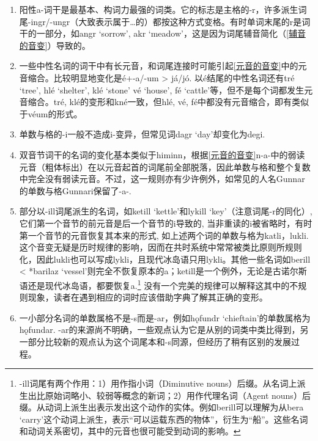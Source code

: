 \begin{enumerate}
  \def\labelenumi{\arabic{enumi})}
  \item
        阳性a-词干是最基本、构词力最强的词类。它的标志是主格的-r，许多派生词尾-ingr/-ungr（大致表示属于\ldots 的）都按这种方式变格。有时单词末尾的r是词干的一部分，如angr
        `sorrow', akr
        `meadow'，这是因为词尾辅音简化（\ref{辅音的音变}）导致的。
  \item
        一些中性名词的词干中有长元音，和词尾连接时可能引起\ref{元音的音变}中的元音缩合。比较明显地变化是é+-a/-um
        \textgreater{} já/jó. 以é结尾的中性名词还有tré `tree', hlé `shelter',
        klé `stone' vé `house', fé
        `cattle'等，但不是每个词都发生元音缩合。tré,
        klé的变形和kné一致，但hlé, vé,
        fé中都没有元音缩合，即有类似于véum的形式。
  \item
        单数与格的-i一般不造成i-变异，但常见词dagr `day'却变化为degi.
  \item
        双音节词干的名词的变化基本类似于himinn，根据\ref{元音的音变}n-a-中的弱读元音（粗体标出）在以元音起首的词尾前全部脱落，因此单数与格和整个复数中完全没有弱读元音。不过，这一规则亦有少许例外，如常见的人名Gunnar的单数与格Gunnari保留了-a-.
  \item
        部分以-ill词尾派生的名词，如ketill `kettle'和lykill
        `key'（注意词尾-r的同化）,
        它们第一个音节的前元音是后一个音节的i导致的,
        当非重读的i被省略时，有时第一个音节的元音恢复其本来的形式,
        如上述两个词的单数与格为katli，lukli.
        这个音变无疑是历时规律的影响，因而在共时系统中常常被类比原则所规则化，因此lukli也可以写成lykli，且现代冰岛语只用lykli。其他一些名词如berill
        \textless{} *barilaz
        `vessel'则完全不恢复原本的a；ketill是一个例外，无论是古诺尔斯语还是现代冰岛语，都要恢复a.\footnote{-ill词尾有两个作用：1）用作指小词（Diminutive
          nouns）后缀。从名词上派生出比原始词略小、较弱等概念的新词；2）用作代理名词（Agent
          nouns）后缀。从动词上派生出表示发出这个动作的实体。例如berill可以理解为从bera
          `carry'这个动词上派生，表示``可以运载东西的物体''，衍生为``船''。这些名词和动词关系密切，其中的元音也很可能受到动词的影响。}
        没有一个完美的规律可以解释这其中的不规则现象，读者在遇到相应的词时应该借助字典了解其正确的变形。
  \item
        一小部分名词的单数属格不是-s而是-ar，例如hǫfundr
        `chieftain'的单数属格为hǫfundar.
        -ar的来源尚不明确，一些观点认为它是从别的词类中类比得到，另一部分比较新的观点认为这个词尾本和-s同源，但经历了稍有区别的发展过程。
\end{enumerate}

